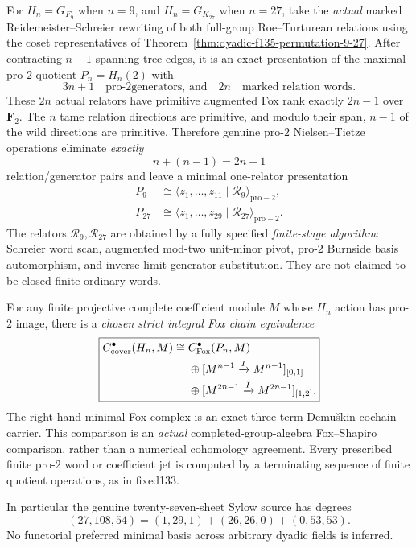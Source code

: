 \begin{theorem}
\label{thm:dyadic-f135-group-fox-9-27}
For $H_n=G_{F_9}$
when $n=9$, and
$H_n=G_{K_{27}}$
when $n=27$,
take the \emph{actual}
marked
Reidemeister--Schreier
rewriting of both
full-group
Roe--Turturean
relations using
the coset representatives
of
Theorem~\ref{thm:dyadic-f135-permutation-9-27}.
After contracting
$n-1$ spanning-tree
edges, it is an
exact presentation
of the maximal
pro-$2$ quotient
$P_n=H_n(2)$
with
\[
3n+1
\quad\text{pro-$2$
generators, and}\quad
2n
\quad\text{marked
relation words}.
\]
These $2n$ actual
relators have
primitive augmented
Fox rank exactly
$2n-1$ over
$\mathbf F_2$.
The $n$ tame
relation directions
are primitive,
and modulo their
span, $n-1$ of
the wild directions
are primitive.
Therefore genuine
pro-$2$
Nielsen--Tietze
operations eliminate
\emph{exactly}
\[
n+(n-1)=2n-1
\]
relation/generator
pairs and leave a
minimal one-relator
presentation
\begin{equation}\label{eq:dyadic-f135-minimal-9-27-presentation}
\boxed{
\begin{aligned}
P_9&\cong
\langle z_1,\ldots,z_{11}
\mid\mathscr R_9\rangle_{\mathrm{pro}-2},\\
P_{27}&\cong
\langle z_1,\ldots,z_{29}
\mid\mathscr R_{27}\rangle_{\mathrm{pro}-2}.
\end{aligned}}
\end{equation}
The relators
$\mathscr R_9,\mathscr R_{27}$
are obtained by a
fully specified
\emph{finite-stage algorithm}:
Schreier word scan,
augmented mod-two
unit-minor pivot,
pro-$2$ Burnside
basis automorphism,
and inverse-limit
generator substitution.
They are not
claimed to be
closed finite
ordinary words.

For any finite
projective complete
coefficient module
$M$ whose
$H_n$ action has
pro-$2$ image,
there is a
\emph{chosen strict
integral Fox chain
equivalence}
\begin{equation}\label{eq:dyadic-f135-group-level-chain-split}
\boxed{
\begin{aligned}
C_{\rm cover}^\bullet(H_n,M)
\cong {}&
C_{\rm Fox}^\bullet(P_n,M)\\
&\oplus
[M^{n-1}\xrightarrow I M^{n-1}]_{[0,1]}\\
&\oplus
[M^{2n-1}\xrightarrow I M^{2n-1}]_{[1,2]}.
\end{aligned}}
\end{equation}
The right-hand
minimal Fox complex
is an exact
three-term
Demu\v{s}kin
cochain carrier.
This comparison
is an \emph{actual}
completed-group-algebra
Fox--Shapiro
comparison,
rather than a
numerical
cohomology agreement.
Every prescribed
finite pro-$2$
word or coefficient
jet is computed
by a terminating
sequence of
finite quotient
operations, as in
fixed133.

In particular
the genuine
twenty-seven-sheet
Sylow source
has degrees
\[
(27,108,54)
=(1,29,1)
+(26,26,0)
+(0,53,53).
\]
No functorial
preferred minimal
basis across
arbitrary dyadic
fields is inferred.
\end{theorem}

